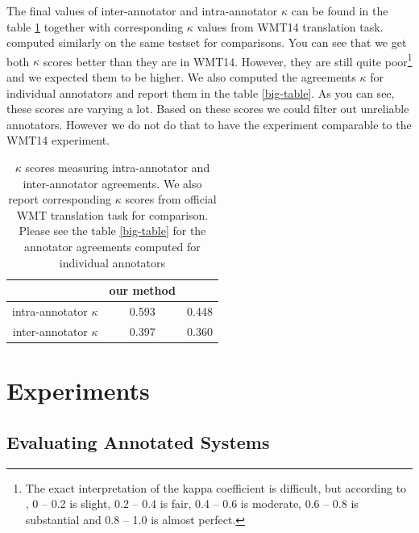 The final values of inter-annotator and intra-annotator $\kappa$ can be found
in the table \ref{agreements} together with corresponding $\kappa$ values from
WMT14 translation task.   computed similarly on
the same testset for comparisons. You can see that we get both $\kappa$ scores
better than they are in WMT14. However, they are still quite poor\footnote{ The
exact interpretation of the kappa coefficient is difficult, but according
to \cite{landis77}, 0 -- 0.2 is slight, 0.2 -- 0.4 is fair, 0.4 -- 0.6 is
moderate, 0.6 -- 0.8 is substantial and 0.8 -- 1.0 is almost perfect.} and we
expected them to be higher. We also computed the agreements $\kappa$ for
individual annotators and report them in the table \ref{big-table}.  As you can
see, these scores are varying a lot. Based on these scores we could filter out
unreliable annotators. However we do not do that to have the experiment
comparable to the WMT14 experiment.


\begin{table}
    \begin{center}
        \begin{tabular}{r|cc}
                                     & our method & \cite{wmt14-overview-paper} \\
            \hline
            intra-annotator $\kappa$ &  0.593     & 0.448    \\
            inter-annotator $\kappa$ &  0.397     & 0.360     \\
        \end{tabular}
    \end{center}

    \caption[Inter-annotator and intra-annotator $\kappa$ scores]{$\kappa$
        scores measuring intra-annotator and inter-annotator agreements. We
        also report corresponding $\kappa$ scores from official WMT translation
        task for comparison.  Please see the table \ref{big-table} for the
    annotator agreements computed for individual annotators}

    \label{agreements}
\end{table}




\section{Experiments}

\subsection{Evaluating Annotated Systems}

